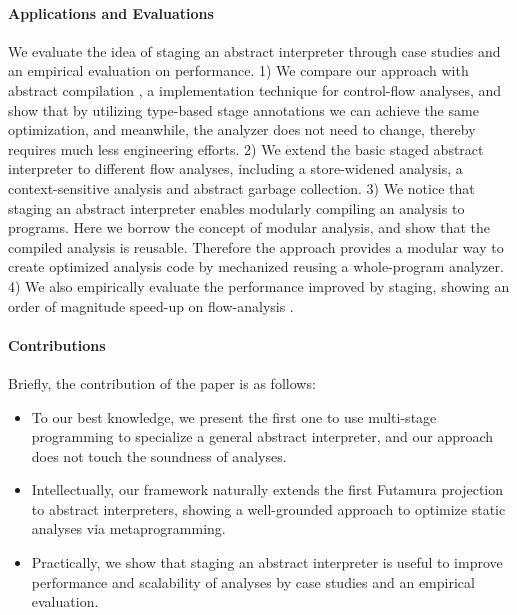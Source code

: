\paragraph{Applications and Evaluations}
We evaluate the idea of staging an abstract interpreter through
case studies and an empirical evaluation on performance.
1) We compare our approach with abstract compilation
\cite{Boucher:1996:ACN:647473.727587}, a implementation technique for
control-flow analyses, and show that by utilizing type-based stage
annotations we can achieve the same optimization, and meanwhile,
the analyzer does not need to change, thereby requires much less
engineering efforts.
2) We extend the basic staged abstract interpreter to different flow
analyses, including a store-widened analysis, a context-sensitive
analysis and abstract garbage collection.
3) We notice that staging an abstract interpreter enables modularly
compiling an analysis to programs. Here we borrow the concept of
modular analysis, and show that the compiled analysis is reusable.
Therefore the approach provides a modular way to create optimized
analysis code by mechanized reusing a whole-program analyzer.
4) We also empirically evaluate the performance improved by staging,
showing an order of magnitude speed-up on flow-analysis .

\paragraph{Contributions} Briefly, the contribution of the paper is as follows:
\begin{itemize}[leftmargin=2em]
  \item To our best knowledge, we present the first one to use
    multi-stage programming to specialize a general abstract interpreter,
    and our approach does not touch the soundness of analyses.
  \item Intellectually, our framework naturally extends the first
    Futamura projection to abstract interpreters, showing a
    well-grounded approach to optimize static analyses via
    metaprogramming.
  \item Practically, we show that staging an abstract interpreter is
    useful to improve performance and scalability of analyses by case
    studies and an empirical evaluation.
\end{itemize}

